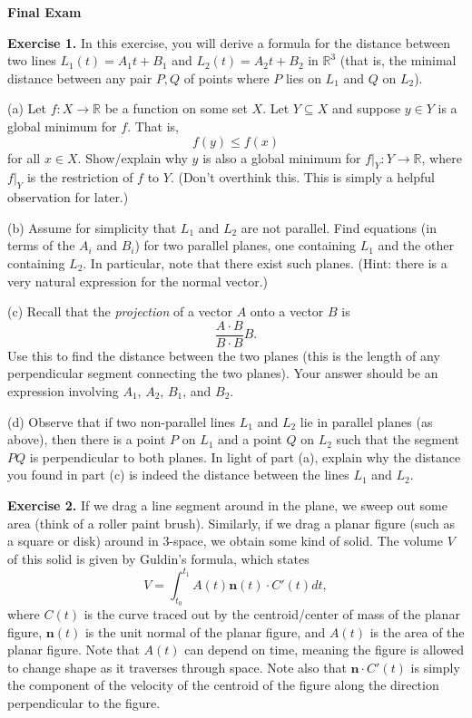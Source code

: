 \documentclass{article}
\begin{document}

\textbf{Final Exam}

\textbf{Exercise 1.} In this exercise, you will derive a formula for the distance between
two lines $L_1(t) = A_1t + B_1$ and $L_2(t) = A_2t + B_2$ in $\mathbb{R}^3$ (that is, the minimal distance between any pair $P,Q$ of points where $P$ lies on $L_1$ and $Q$ on $L_2$).

(a) Let $f: X \to \mathbb{R}$ be a function on some set $X$. Let $Y \subseteq X$
and suppose $y \in Y$ is a global minimum for $f$. That is, 
\[f(y) \leq f(x)\]
for all $x \in X$. Show/explain why $y$ is also a global minimum for
$f|_Y: Y \to \mathbb{R}$, where $f|_Y$ is the restriction of $f$ to $Y$. 
(Don't overthink this. This is simply a helpful observation for later.)

(b) Assume for simplicity that $L_1$ and $L_2$ are not parallel. Find equations
(in terms of the $A_i$ and $B_i$) for two parallel planes, one containing $L_1$ and the other containing $L_2$.
In particular, note that there exist such planes. (Hint: there is a very natural expression for the normal vector.)

(c) Recall that the \emph{projection} of a vector $A$ onto a vector $B$ is 
\[\frac{A \cdot B}{B \cdot B} B.\]
Use this to find the distance between the two planes (this is the length of any perpendicular segment connecting the two planes). Your answer should
be an expression involving $A_1$, $A_2$, $B_1$, and $B_2$. 

(d) Observe that if two non-parallel lines $L_1$ and $L_2$ lie in parallel planes (as above), then
there is a point $P$ on $L_1$ and a point $Q$ on $L_2$ such that the segment $PQ$ 
is perpendicular to both planes. In light of part (a), explain why
the distance you found in part (c) is indeed the distance between the lines $L_1$ and $L_2$.

\newpage
\textbf{Exercise 2.} If we drag a line segment around in the plane, we sweep out
some area (think of a roller paint brush). Similarly, if we drag a planar figure (such as a square or disk) around in 3-space,
we obtain some kind of solid. The volume $V$ of this solid is given by Guldin's formula, which states
\[V = \int_{t_0}^{t_1} A(t) \mathbf{n}(t)\cdot C'(t) dt,\]
where $C(t)$ is the curve traced out by the centroid/center of mass of the planar figure, $\mathbf{n}(t)$ is the unit normal of the planar figure,
and $A(t)$ is the area of the planar figure. Note that $A(t)$ can depend on time, meaning
the figure is allowed to change shape as it traverses through space. Note also that $\mathbf{n}\cdot C'(t)$ is
simply the component of the velocity of the centroid of the figure along the direction perpendicular to the figure.
\end{document}
